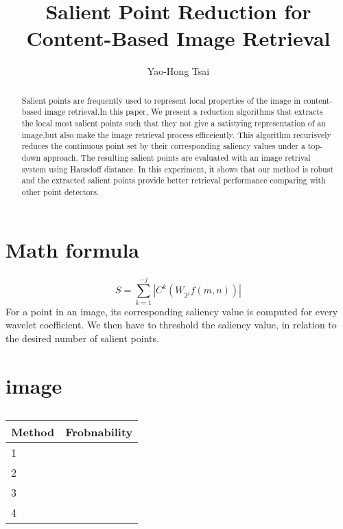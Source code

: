 \documentclass[10pt,twocolumn,letterpaper]{article}
\begin{document}
\title{Salient Point Reduction for Content-Based Image Retrieval}

\author{Yao-Hong Tsai}

\maketitle

\begin{abstract}

	Salient points are frequently used to represent local properties of the 
	image in content-based image retrieval.In this paper, We present a reduction
	algorithms that extracts the local most salient points such that they not give
	a satistying representation of an image,but also make the image retrieval process
	efficeiently. This algorithm recurisvely reduces the continuous point set by 
	their corresponding saliency values under a top-down approach. 
	The resulting salient points are evaluated with an image retrival system 
	using Hausdoff distance. In this experiment, it shows that our method
	is robust and the extracted salient points provide better retrieval
	performance comparing with other point detectors.
   
\end{abstract}


\section{Math formula}
\begin{equation}
	S=\sum_{k=1}^{-j}\left | C^{k}(W_{2^{j}}f(m,n)) \right |
\end{equation}
	For a point in an image, its corresponding saliency value is
	computed for every wavelet coefficient. We then have to
	threshold the saliency value, in relation to the desired number
	of salient points. 
\section{image}

	\begin{table}[H]
	\begin{center}
	\begin{tabular}{|l|c|}
	\hline
	Method & Frobnability \\
	\hline\hline
	1 & \\
	2 & \\
	3 & \\
	4 & \\
	\hline
	\end{tabular}
	\end{center}
	\caption{}
	\end{table}
\end{document}
